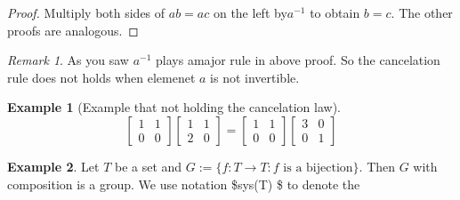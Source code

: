 \documentclass[
]{book}
\theoremstyle{definition}
\theoremstyle{definition}
\newtheorem{example}{Example}[chapter]
\theoremstyle{definition}
\theoremstyle{definition}
\theoremstyle{remark}
\newtheorem*{remark}{Remark}
\begin{document}
\begin{proof}
Multiply both sides of \(ab=ac\) on the left by\(a^{-1}\) to obtain \(b = c\). The other proofs are analogous.
\end{proof}

\begin{remark}
As you saw \(a^{-1}\) plays amajor rule in above proof. So the cancelation rule does not holds when elemenet \(a\) is not invertible.
\end{remark}

\begin{example}[Example that not holding the cancelation law]
\protect\hypertarget{exm:unnamed-chunk-12}{}\label{exm:unnamed-chunk-12}\[\begin{bmatrix} 1 & 1 \\ 0 & 0\end{bmatrix}
\begin{bmatrix} 1 & 1 \\ 2 & 0\end{bmatrix}=
\begin{bmatrix} 1 & 1 \\ 0 & 0\end{bmatrix}
\begin{bmatrix} 3 & 0 \\ 0 & 1\end{bmatrix}\]
\end{example}

\begin{example}
\protect\hypertarget{exm:unnamed-chunk-13}{}\label{exm:unnamed-chunk-13}Let \(T\) be a set and \(G:=\{f:T\to T: f \text{ is a bijection}\}\). Then \(G\) with composition is a group. We use notation \$sys(T) \$ to denote the
\end{example}
\end{document}
